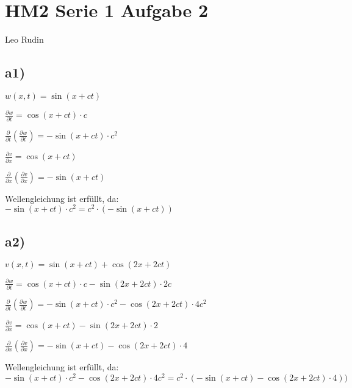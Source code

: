 \documentclass{article}
\begin{document}
\section*{HM2 Serie 1 Aufgabe 2}
Leo Rudin

\subsection*{a1)}

\(w(x,t) = \sin(x+ct)\)

\(\frac{\partial w}{\partial t} = \cos(x+ct) \cdot c\)

\(\frac{\partial }{\partial t} \left(\frac{\partial w}{\partial t}\right) = -\sin(x+ct) \cdot c^2\)

\(\frac{\partial v}{\partial x} = \cos(x+ct)\)

\(\frac{\partial }{\partial x} \left(\frac{\partial v}{\partial x}\right) = -\sin(x+ct)\)

Wellengleichung ist erfüllt, da:\\
\(-\sin(x+ct) \cdot c^2 = c^2 \cdot (-\sin(x+ct))\)

\subsection*{a2)}

\(v(x,t) = \sin(x+ct)+\cos(2x+2ct)\)

\(\frac{\partial w}{\partial t} = \cos(x+ct) \cdot c - \sin(2x+2ct) \cdot 2c\)

\(\frac{\partial }{\partial t} \left(\frac{\partial w}{\partial t}\right) = -\sin(x+ct)\cdot c^2 - \cos(2x+2ct) \cdot 4c^2\)

\(\frac{\partial v}{\partial x} = \cos(x+ct) - \sin(2x + 2ct) \cdot 2\)

\(\frac{\partial }{\partial x} \left(\frac{\partial v}{\partial x}\right) = -\sin(x+ct) - \cos(2x+2ct) \cdot 4\)

Wellengleichung ist erfüllt, da:\\
\(-\sin(x+ct)\cdot c^2 - \cos(2x+2ct) \cdot 4c^2 = c^2 \cdot (-\sin(x+ct) - \cos(2x+2ct) \cdot 4))\)
\end{document}
